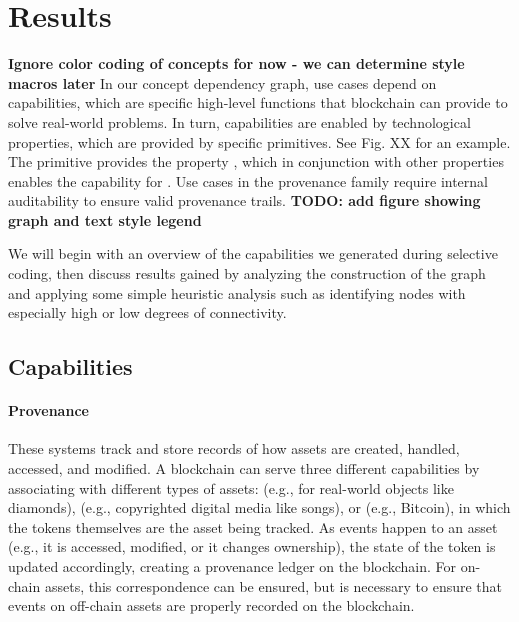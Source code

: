 
\section{Results}
\textbf{Ignore color coding of concepts for now - we can determine style macros later}
\newline
In our concept dependency graph, use cases depend on capabilities, which are specific high-level functions that blockchain can provide to solve real-world problems. In turn, capabilities are enabled by technological properties, which are provided by specific primitives. See Fig. XX for an example.  The primitive  provides the property , which in conjunction with other properties enables the capability for . Use cases in the provenance family require internal auditability to ensure valid provenance trails.
\textbf{TODO: add figure showing graph and text style legend}

We will begin with an overview of the capabilities we generated during selective coding, then discuss results gained by analyzing the construction of the graph and applying some simple heuristic analysis such as identifying nodes with especially high or low degrees of connectivity.

\subsection{Capabilities}
\paragraph{Provenance} These systems track and store records of how assets are created, handled, accessed, and modified. A blockchain can serve three different capabilities by associating  with different types of assets:  (e.g., for real-world objects like diamonds),  (e.g., copyrighted digital media like songs), or  (e.g., Bitcoin), in which the tokens themselves are the asset being tracked. As events happen to an asset (e.g., it is accessed, modified, or it changes ownership), the state of the token is updated accordingly, creating a provenance ledger on the blockchain. For on-chain assets, this correspondence can be ensured, but  is necessary to ensure that events on off-chain assets are properly recorded on the blockchain.

